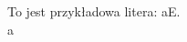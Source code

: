 \documentclass[12pt,polish]{article}
\begin{document}
To jest przykładowa litera: {\mojelitery aE}.\\
{\mojelitery a}
\end{document}
